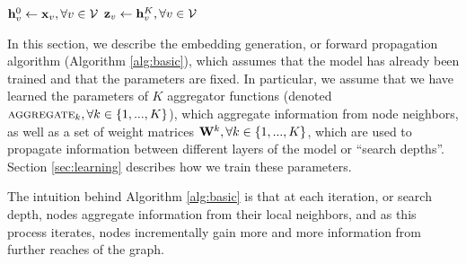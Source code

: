 \label{sec:method}
\begin{algorithm}
\caption{\name\ embedding generation (i.e., forward propagation) algorithm}
\label{alg:basic}
    \BlankLine
    $\mathbf{h}^0_v \leftarrow \mathbf{x}_v, \forall v \in \mathcal{V}$ \;
     $\mathbf{z}_v\leftarrow \mathbf{h}^{K}_v, \forall v \in \mathcal{V}$ 
\end{algorithm}

In this section, we describe the embedding generation, or forward propagation algorithm (Algorithm \ref{alg:basic}), which assumes that the model has already been trained and that the parameters are fixed. 
In particular, we assume that we have learned the parameters of $K$ aggregator functions (denoted $\textsc{aggregate}_k, \forall k \in \{1,...,K\}$), which aggregate information from node neighbors, as well as a set of weight matrices $\mathbf{W}^{k}, \forall k \in \{1,...,K\}$, which are used to propagate information between different layers of the model or ``search depths''. 
Section \ref{sec:learning} describes how we train these parameters. 

The intuition behind Algorithm \ref{alg:basic} is that at each iteration, or search depth, nodes aggregate information from their local neighbors, and as this process iterates, nodes incrementally gain more and more information from further reaches of the graph.

